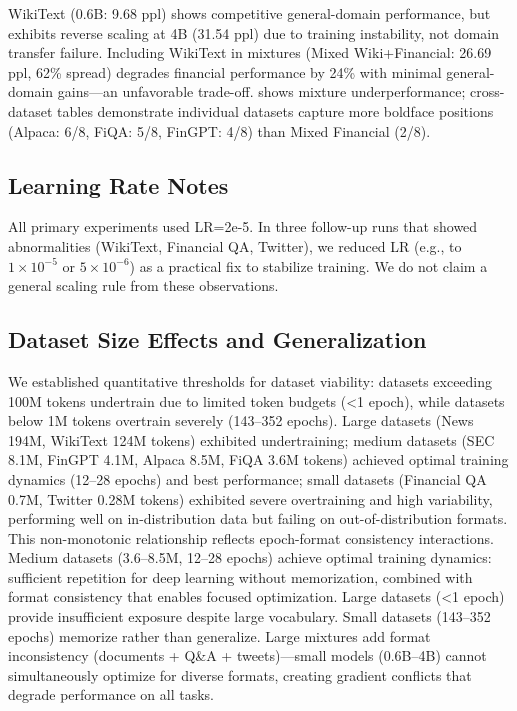 WikiText (0.6B: 9.68 ppl) shows competitive general-domain performance, but exhibits reverse scaling at 4B (31.54 ppl) due to training instability, not domain transfer failure. Including WikiText in mixtures (Mixed Wiki+Financial: 26.69 ppl, 62\% spread) degrades financial performance by 24\% with minimal general-domain gains—an unfavorable trade-off.  shows mixture underperformance; cross-dataset tables demonstrate individual datasets capture more boldface positions (Alpaca: 6/8, FiQA: 5/8, FinGPT: 4/8) than Mixed Financial (2/8).

\subsection{Learning Rate Notes}

All primary experiments used LR=2e-5. In three follow-up runs that showed abnormalities (WikiText, Financial QA, Twitter), we reduced LR (e.g., to $1\times10^{-5}$ or $5\times10^{-6}$) as a practical fix to stabilize training. We do not claim a general scaling rule from these observations.

\subsection{Dataset Size Effects and Generalization}

We established quantitative thresholds for dataset viability: datasets exceeding 100M tokens undertrain due to limited token budgets (<1 epoch), while datasets below 1M tokens overtrain severely (143–352 epochs). Large datasets (News 194M, WikiText 124M tokens) exhibited undertraining; medium datasets (SEC 8.1M, FinGPT 4.1M, Alpaca 8.5M, FiQA 3.6M tokens) achieved optimal training dynamics (12–28 epochs) and best performance; small datasets (Financial QA 0.7M, Twitter 0.28M tokens) exhibited severe overtraining and high variability, performing well on in-distribution data but failing on out-of-distribution formats. This non-monotonic relationship reflects epoch-format consistency interactions. Medium datasets (3.6–8.5M, 12–28 epochs) achieve optimal training dynamics: sufficient repetition for deep learning without memorization, combined with format consistency that enables focused optimization. Large datasets (<1 epoch) provide insufficient exposure despite large vocabulary. Small datasets (143–352 epochs) memorize rather than generalize. Large mixtures add format inconsistency (documents + Q\&A + tweets)—small models (0.6B–4B) cannot simultaneously optimize for diverse formats, creating gradient conflicts that degrade performance on all tasks.

